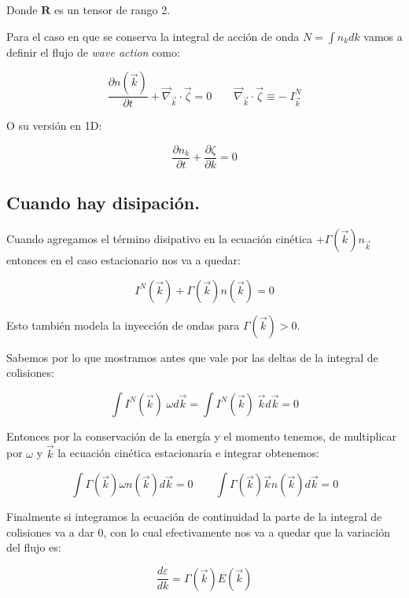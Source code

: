 Donde $\mathbf{R}$ es un tensor de rango 2.

Para el caso en que se conserva la integral de acción de onda $N=\int n_k dk$ vamos a definir el flujo de \textit{wave action} como:

\begin{equation}
	\frac{\partial n(\vec k)}{\partial t} + \vec\nabla_{\vec k} \cdot \vec \zeta = 0  \qquad \vec\nabla_{\vec k} \cdot \vec \zeta \equiv - \;I_{\vec k}^N
\end{equation}

O su versión en 1D:

\begin{equation}
	\frac{\partial n_k}{\partial t} + \frac{\partial \zeta}{\partial k} = 0
\end{equation}


\subsection*{Cuando hay disipación.}
Cuando agregamos el término disipativo en la ecuación cinética $+\Gamma({\vec k})n_{\vec k}$ entonces en el caso estacionario nos va a quedar:

\begin{equation}
	I^N(\vec k) + \Gamma(\vec k)n(\vec k) = 0
\end{equation}

Esto también modela la inyección de ondas para $\Gamma(\vec k)>0$. 

Sabemos por lo que mostramos antes que vale por las deltas de la integral de colisiones:

\begin{equation}
	\int I^N({\vec k}) \; \omega d\vec k = \int I^N({\vec k})\; \vec k d\vec k = 0 
\end{equation}

Entonces por la conservación de la energía y el momento tenemos, de multiplicar por $\omega$ y $\vec k$ la ecuación cinética estacionaria e integrar obtenemos:

\begin{equation}
	\int \Gamma(\vec k) \omega n(\vec k)d\vec k = 0 \qquad \int \Gamma(\vec k) \vec k n(\vec k)d\vec k = 0
\end{equation}


Finalmente si integramos la ecuación de continuidad la parte de la integral de colisiones va a dar 0, con lo cual efectivamente nos va a quedar que la variación del flujo es:

\begin{equation}
	\frac{d\varepsilon}{dk} = \Gamma(\vec k)E(\vec k)
\end{equation}

